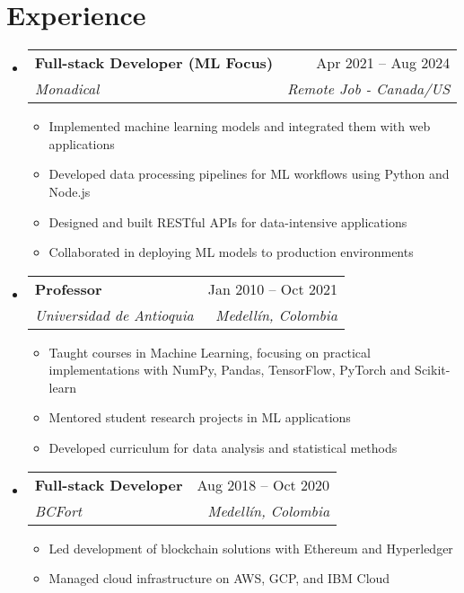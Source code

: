 \documentclass[letterpaper,11pt]{article}
\makeatletter
\newcommand{\resumeSubheading}[4]{
  \vspace{-2pt}
  \item[]
  \begin{tabular*}{\textwidth}{@{\extracolsep{\fill}}l r}
    \textbf{#1} & #2 \\
    \textit{#3} & \textit{#4} \\
  \end{tabular*}
  \vspace{-5pt}
}
\makeatother
\begin{document}
\section{Experience}
\begin{itemize}[leftmargin=0pt, itemindent=0pt, label={}]
\resumeSubheading
{Full-stack Developer (ML Focus)}{Apr 2021 -- Aug 2024}
{Monadical}{Remote Job - Canada/US}
\begin{itemize}[leftmargin=*]
    \item Implemented machine learning models and integrated them with web applications
    \item Developed data processing pipelines for ML workflows using Python and Node.js
    \item Designed and built RESTful APIs for data-intensive applications
    \item Collaborated in deploying ML models to production environments
\end{itemize}

\resumeSubheading
{Professor}{Jan 2010 -- Oct 2021}
{Universidad de Antioquia}{Medellín, Colombia}
\begin{itemize}[leftmargin=*]
    \item Taught courses in Machine Learning, focusing on practical implementations with NumPy, Pandas, TensorFlow, PyTorch and Scikit-learn
    \item Mentored student research projects in ML applications
    \item Developed curriculum for data analysis and statistical methods
\end{itemize}

\resumeSubheading
{Full-stack Developer}{Aug 2018 -- Oct 2020}
{BCFort}{Medellín, Colombia}
\begin{itemize}[leftmargin=*]
    \item Led development of blockchain solutions with Ethereum and Hyperledger
    \item Managed cloud infrastructure on AWS, GCP, and IBM Cloud
\end{itemize}
\end{itemize}
\end{document}
